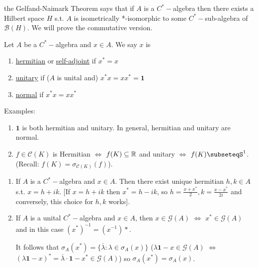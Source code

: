\documentclass{article}
\begin{document}
\begin{remark}
    the Gelfand-Naimark Theorem says that if $A$ is a $C^*-$algebra then there exists a Hilbert space $H$ s.t. $A$ is isometrically *-isomorphic to some $C^*-$sub-algebra of $\mathcal{B}(H)$. We will prove the commutative version.
\end{remark}

\begin{boxdef}\label{def: hermitian, unitary}
    Let $A$ be a $C^*-$algebra and $x\in A$. We say $x$ is 
    \begin{enumerate}[label = (\roman*), align = left]
        \item \noindent\underline{hermitian} or \noindent\underline{self-adjoint} if $x^* = x$
        \item \noindent\underline{unitary} if ($A$ is unital and) $x^*x = xx^* = \mathbf{1}$
        \item \noindent\underline{normal} if $x^*x = xx^*$
    \end{enumerate}
\end{boxdef}

\begin{examplesblock}{Examples:}\label{examples: 13}
    \begin{enumerate}
        \item $\mathbf{1}$ is both hermitian and unitary. In general, hermitian and unitary are normal.
        \item $f\in \mathcal{C}(K)$ is Hermitian $\iff$ $f(K)\subseteq\mathbb{R}$ and unitary $\iff$ $f(K)\subseteqS^1$.
         (Recall: $f(K)=\sigma_{\mathcal{C}(K)}(f)$).
    \end{enumerate}
\end{examplesblock}

\begin{remark}
    \begin{enumerate}
        \item If $A$ is a $C^*-$algebra and $x\in A$. Then there exist unique hermitian $h,k\in A$ s.t. $x = h+ik$.
        [If $x = h+ik$ then $x^* = h-ik$, so $h = \frac{x+x^*}{2}, k = \frac{x-x^*}{2i}$ and conversely, this choice for $h,k$ works].
        \item If $A$ is a unital $C^*-$algebra and $x\in A$, then $x\in \mathcal{G}(A)$ $\iff$ $x^*\in \mathcal{G}(A)$ and in this case $(x^*)^{-1}=(x^{-1})*$. 

        It follows that $\sigma_A(x^*) = \{\overline{\lambda}:\lambda\in \sigma_A(x)\}$ ($\lambda\mathbf{1}-x\in \mathcal{G}(A)$ $\iff$ $(\lambda\mathbf{1}-x)^* = \overline{\lambda}\cdot\mathbf{1}-x^*\in\mathcal{G}(A)$) so $\sigma_A(x^*) = \sigma_A(x)$.
    \end{enumerate}
\end{remark}
\end{document}
